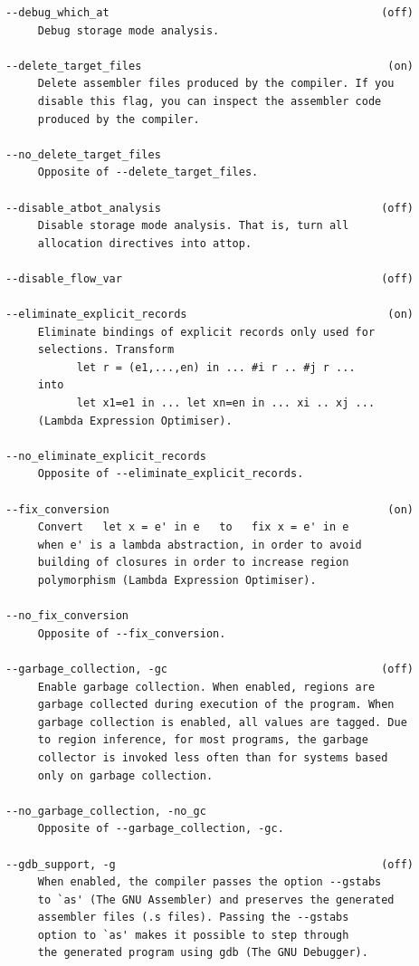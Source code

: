 \documentclass[12pt]{book}
\begin{document}
\begin{verbatim}
--debug_which_at                                          (off)
     Debug storage mode analysis.

--delete_target_files                                      (on)
     Delete assembler files produced by the compiler. If you
     disable this flag, you can inspect the assembler code
     produced by the compiler.

--no_delete_target_files
     Opposite of --delete_target_files.

--disable_atbot_analysis                                  (off)
     Disable storage mode analysis. That is, turn all
     allocation directives into attop.

--disable_flow_var                                        (off)

--eliminate_explicit_records                               (on)
     Eliminate bindings of explicit records only used for
     selections. Transform
           let r = (e1,...,en) in ... #i r .. #j r ...
     into
           let x1=e1 in ... let xn=en in ... xi .. xj ...
     (Lambda Expression Optimiser).

--no_eliminate_explicit_records
     Opposite of --eliminate_explicit_records.

--fix_conversion                                           (on)
     Convert   let x = e' in e   to   fix x = e' in e
     when e' is a lambda abstraction, in order to avoid
     building of closures in order to increase region
     polymorphism (Lambda Expression Optimiser).

--no_fix_conversion
     Opposite of --fix_conversion.

--garbage_collection, -gc                                 (off)
     Enable garbage collection. When enabled, regions are
     garbage collected during execution of the program. When
     garbage collection is enabled, all values are tagged. Due
     to region inference, for most programs, the garbage
     collector is invoked less often than for systems based
     only on garbage collection.

--no_garbage_collection, -no_gc
     Opposite of --garbage_collection, -gc.

--gdb_support, -g                                         (off)
     When enabled, the compiler passes the option --gstabs
     to `as' (The GNU Assembler) and preserves the generated
     assembler files (.s files). Passing the --gstabs
     option to `as' makes it possible to step through
     the generated program using gdb (The GNU Debugger).


\end{verbatim}
\end{document}
